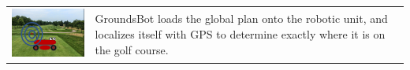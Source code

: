 \documentclass[12pt]{extarticle}
\begin{document}
\begin{table}[H]
\begin{tabularx}{\textwidth}{cX}
\\
\includegraphics[width=6cm, valign=t]{usecase1_4.png} &
GroundsBot loads the global plan onto the robotic unit, and localizes itself with GPS to determine exactly where it is on the golf course.
\\
\end{tabularx}
\end{table}

\begin{table}[H]
   \def\arraystretch{4}
   \setlength\tabcolsep{8pt}



\end{table}
\end{document}
